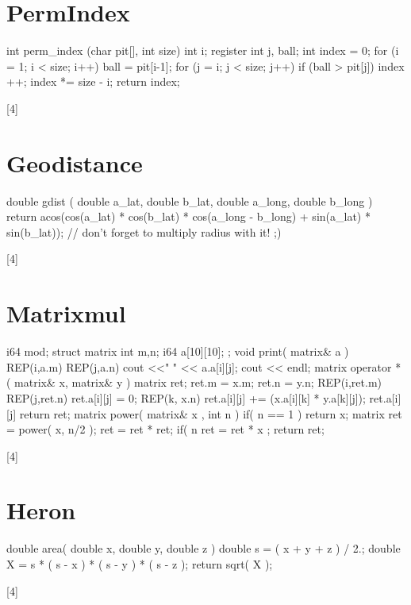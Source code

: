 \documentclass[a4paper,9pt]{article}
\begin{document}
\section{PermIndex}
\begin{verbatimtab}[4]
	int perm_index (char pit[], int size) {
		int i;
		register int j, ball;
		int index = 0;
		for (i = 1; i < size; i++) {
			ball = pit[i-1];
			for (j = i; j < size; j++) {
				if (ball > pit[j])
				index ++;
			}
			index *= size - i;
		}
		return index;
	}
\end{verbatimtab}[4]

\section{Geodistance}
\begin{verbatimtab}[4]
	double gdist
	( double a_lat, double b_lat, double a_long, double b_long ) {
		return acos(cos(a_lat) * cos(b_lat) * cos(a_long - b_long) + sin(a_lat) * sin(b_lat));
	} // don't forget to multiply radius with it! ;)
\end{verbatimtab}[4]

\section{Matrixmul}
\begin{verbatimtab}[4]
	i64 mod;
	struct matrix {
		int m,n;
		i64 a[10][10];
	};
	void print( matrix& a ) {
		REP(i,a.m) {
			REP(j,a.n) cout <<" " << a.a[i][j];
			cout << endl;
		}
	}
	matrix operator * (  matrix& x,  matrix& y ) {
		matrix ret;
		ret.m = x.m;
		ret.n = y.n;
		REP(i,ret.m) REP(j,ret.n) {
			ret.a[i][j] = 0;
			REP(k, x.n) {
				ret.a[i][j] += (x.a[i][k] * y.a[k][j]);
				ret.a[i][j] %
			}
		}
		return ret;
	}
	matrix power( matrix& x , int n ) {
		if( n == 1 ) return x;
		matrix ret = power( x, n/2 );
		ret = ret * ret;
		if( n %
		ret = ret * x ;
		return ret;
	}
\end{verbatimtab}[4]

\section{Heron}
\begin{verbatimtab}[4]
	double area( double x, double y, double z ) {
		double s = ( x + y + z ) / 2.;
		double X = s * ( s - x ) * ( s - y ) * ( s - z );
		return sqrt( X );
	}
\end{verbatimtab}[4]
\end{document}
